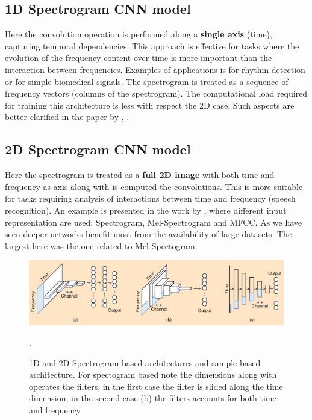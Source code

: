 \subsection{1D Spectrogram CNN model}
Here the convolution operation is performed along a \textbf{single axis} (time), capturing temporal dependencies. This approach is effective for tasks where the evolution of the frequency content over time is more important than the interaction between frequencies. Examples of applications is for rhythm detection or for simple biomedical signals. The spectrogram is treated as a sequence of frequency vectors (columns of the spectrogram). The computational load required for training this architecture is less with respect the 2D case. Such aspects are better clarified in the paper by , \cite{nam2018deep}. 

\subsection{2D Spectrogram CNN model}
Here the spectrogram is treated as a \textbf{full 2D image} with both time and frequency as axis along with is computed the convolutions. This is more suitable for tasks requiring analysis of interactions between time and frequency (speech recognition). An example is presented in the work by , \cite{choi2016automatic} where different input representation are used: Spectrogram, Mel-Spectrogram and MFCC. As we have seen deeper networks benefit most from the availability of large datasets. The largest here was the one related to Mel-Spectogram.

\begin{figure}
    \centering
    \includegraphics[scale=0.5]{img/Spec_SampleBased.png}
    \caption{1D and 2D Spectrogram based architectures and sample based architecture. For spectogram based note the dimensions along with operates the filters, in the first case the filter is slided along the time dimension, in the second case (b) the filters accounts for both time and frequency}.
    \label{fig:audio_archs}
\end{figure}

